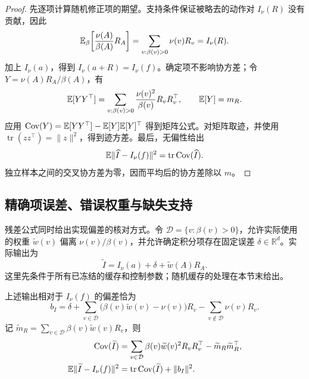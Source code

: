 \begin{proof}
先逐项计算随机修正项的期望。支持条件保证被略去的动作对 $I_\nu(R)$ 没有贡献，因此
\begin{equation*}
 \mathbb E_\beta\!\left[\frac{\nu(A)}{\beta(A)}R_A\right]
 =\sum_{v:\beta(v)>0}\nu(v)R_v=I_\nu(R).
\end{equation*}
加上 $I_\nu(a)$，得到 $I_\nu(a+R)=I_\nu(f)$。确定项不影响协方差；令 $Y=\nu(A)R_A/\beta(A)$，有
\begin{equation*}
 \mathbb E[YY^\top]
 =\sum_{v:\beta(v)>0}\frac{\nu(v)^2}{\beta(v)}R_vR_v^\top,
 \qquad \mathbb E[Y]=m_R.
\end{equation*}
应用 $\operatorname{Cov}(Y)=\mathbb E[YY^\top]-\mathbb E[Y]\mathbb E[Y]^\top$ 得到矩阵公式。对矩阵取迹，并使用 $\operatorname{tr}(zz^\top)=\lVert z\rVert^2$，得到迹方差。最后，无偏性给出
\begin{equation*}
 \mathbb E\lVert\widehat I-I_\nu(f)\rVert^2
 =\operatorname{tr}\operatorname{Cov}(\widehat I).
\end{equation*}
独立样本之间的交叉协方差为零，因而平均后的协方差除以 $m$。
\end{proof}

\subsection{精确项误差、错误权重与缺失支持}

残差公式同时给出实现偏差的核对方式。令 $\mathcal D=\{v:\beta(v)>0\}$，允许实际使用的权重 $\widetilde w(v)$ 偏离 $\nu(v)/\beta(v)$，并允许确定积分项存在固定误差 $\delta\in\mathbb R^d$。实际输出为
\begin{equation*}
 \widetilde I=I_\nu(a)+\delta+\widetilde w(A)R_A.
\end{equation*}
这里先条件于所有已冻结的缓存和控制参数；随机缓存的处理在本节末给出。

\begin{theorem}[三种误差来源的统一偏差]
\label{est:thm:kl-master-bias}
上述输出相对于 $I_\nu(f)$ 的偏差恰为
\begin{equation}
 b_I=\delta
 +\sum_{v\in\mathcal D}\bigl(\beta(v)\widetilde w(v)-\nu(v)\bigr)R_v
 -\sum_{v\notin\mathcal D}\nu(v)R_v.
 \label{est:eq:kl-master-bias}
\end{equation}
记 $\widetilde m_R=\sum_{v\in\mathcal D}\beta(v)\widetilde w(v)R_v$，则
\begin{align}
 \operatorname{Cov}(\widetilde I)
 &=\sum_{v\in\mathcal D}\beta(v)\widetilde w(v)^2R_vR_v^\top
 -\widetilde m_R\widetilde m_R^\top,\\
 \mathbb E\lVert\widetilde I-I_\nu(f)\rVert^2
 &=\operatorname{tr}\operatorname{Cov}(\widetilde I)+\lVert b_I\rVert^2.
 \label{est:eq:kl-master-mse}
\end{align}
\end{theorem}

